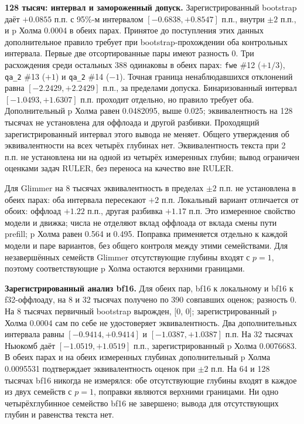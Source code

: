 \textbf{128 тысяч: интервал и замороженный допуск.} Зарегистрированный bootstrap даёт
$+0.0855$ п.п. с 95\%-м интервалом $[-0.6838,+0.8547]$ п.п., внутри $\pm2$ п.п.,
и p Холма 0.0004 в обеих парах. Принятое до поступления этих данных дополнительное правило требует
при bootstrap-прохождении оба контрольных интервала. Первые две отсортированные пары имеют разность 0.
Три расхождения среди остальных 388 одинаковы в обеих парах:
\texttt{fwe} \#12 ($+1/3$), \texttt{qa\_2} \#13 ($+1$) и \texttt{qa\_2} \#14 ($-1$).
Точная граница ненаблюдавшихся отклонений равна $[-2.2429,+2.2429]$ п.п., за пределами допуска.
Бинаризованный интервал $[-1.0493,+1.6307]$ п.п. проходит отдельно, но правило требует оба.
Дополнительный p Холма равен 0.0482095, выше 0.025; эквивалентность на 128 тысячах не установлена
для оффлоада и другой разбивки. Проходящий зарегистрированный интервал этого вывода не меняет.
Общего утверждения об эквивалентности на всех четырёх глубинах нет.
Эквивалентность текста при 2 п.п. не установлена ни на одной из четырёх измеренных глубин;
вывод ограничен оценками задач RULER, без переноса на качество вне RULER.

Для Glimmer на 8 тысячах эквивалентность в пределах $\pm2$ п.п. не установлена в обеих парах: оба интервала пересекают $+2$ п.п.
Локальный вариант отличается от обоих: оффлоад $+1.22$ п.п., другая разбивка $+1.17$ п.п.
Это измеренное свойство модели и движка; числа не отделяют вклад оффлоада от вклада смены пути prefill;
p Холма равен 0.564 и 0.495. Поправка применяется отдельно к каждой модели и паре вариантов,
без общего контроля между этими семействами. Для незавершённых семейств Glimmer отсутствующие глубины
входят с $p=1$, поэтому соответствующие p Холма остаются верхними границами.

\textbf{Зарегистрированный анализ bf16.} Для обеих пар, bf16 к локальному и bf16 к f32-оффлоаду,
на 8 и 32 тысячах получено по 390 совпавших оценок; разность 0. На 8 тысячах первичный bootstrap
вырожден, [0, 0]; зарегистрированный p Холма 0.0004 сам по себе не удостоверяет эквивалентность.
Два дополнительных интервала равны $[-0.9414,+0.9414]$ и $[-1.0387,+1.0387]$ п.п.
На 32 тысячах Ньюкомб даёт $[-1.0519,+1.0519]$ п.п., зарегистрированный p Холма 0.0076683.
В обеих парах и на обеих измеренных глубинах дополнительный p Холма 0.0095531 подтверждает
эквивалентность оценок при $\pm2$ п.п. На 64 и 128 тысячах bf16 никогда не измерялся:
обе отсутствующие глубины входят в каждое из двух семейств с $p=1$, поправки являются верхними границами.
Ни одно четырёхглубинное семейство bf16 не завершено; вывода для отсутствующих глубин и равенства текста нет.

